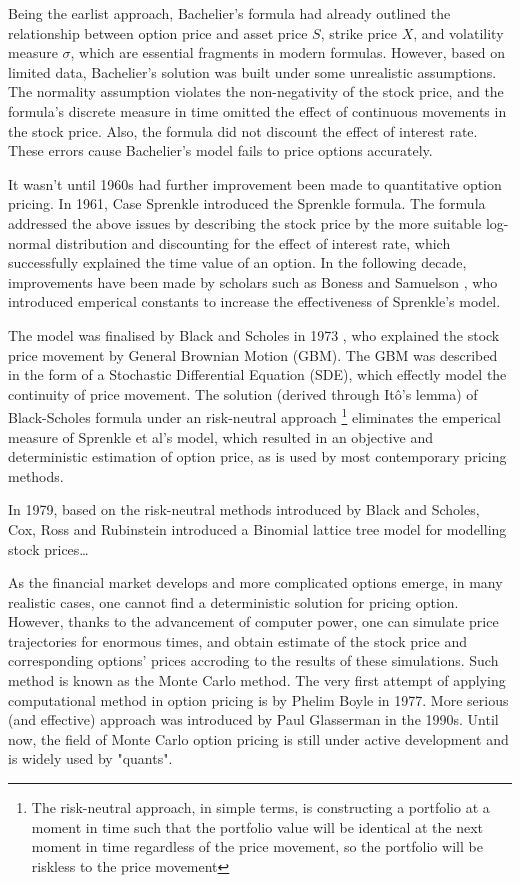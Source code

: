 Being the earlist approach, Bachelier's formula had already outlined the relationship between option price and asset price $S$, strike price $X$, and volatility measure $\sigma$, which are essential fragments in modern formulas. However, based on limited data, Bachelier's solution was built under some unrealistic assumptions. The normality assumption violates the non-negativity of the stock price, and the formula's discrete measure in time omitted the effect of continuous movements in the stock price. Also, the formula did not discount the effect of interest rate. These errors cause Bachelier's model fails to price options accurately.

It wasn't until 1960s had further improvement been made to quantitative option pricing. In 1961, Case Sprenkle \cite{Sprenkle1961} introduced the Sprenkle formula. The formula addressed the above issues by describing the stock price by the more suitable log-normal distribution and discounting for the effect of interest rate, which successfully explained the time value of an option. In the following decade, improvements have been made by scholars such as Boness and Samuelson \cite{BS1973}, who introduced emperical constants to increase the effectiveness of Sprenkle's model.

The model was finalised by Black and Scholes in 1973 \cite{BS1973}, who explained the stock price movement by General Brownian Motion (GBM). The GBM was described in the form of a Stochastic Differential Equation (SDE), which effectly model the continuity of price movement. The solution (derived through Itô's lemma) of Black-Scholes formula under an risk-neutral approach \footnote{The risk-neutral approach, in simple terms, is constructing a portfolio at a moment in time such that the portfolio value will be identical at the next moment in time regardless of the price movement, so the portfolio will be riskless to the price movement} eliminates the emperical measure of Sprenkle et al's model, which resulted in an objective and deterministic estimation of option price, as is used by most contemporary pricing methods.

In 1979, based on the risk-neutral methods introduced by Black and Scholes, Cox, Ross and Rubinstein \cite{CRR1979} introduced a Binomial lattice tree model for modelling stock prices\dots

As the financial market develops and more complicated options emerge, in many realistic cases, one cannot find a deterministic solution for pricing option. However, thanks to the advancement of computer power, one can simulate price trajectories for enormous times, and obtain estimate of the stock price and corresponding options' prices accroding to the results of these simulations. Such method is known as the Monte Carlo method. The very first attempt of applying computational method in option pricing is by Phelim Boyle in 1977. More serious (and effective) approach was introduced by Paul Glasserman \cite{Glasserman2003} in the 1990s. Until now, the field of Monte Carlo option pricing is still under active development and is widely used by "quants".

\newpage